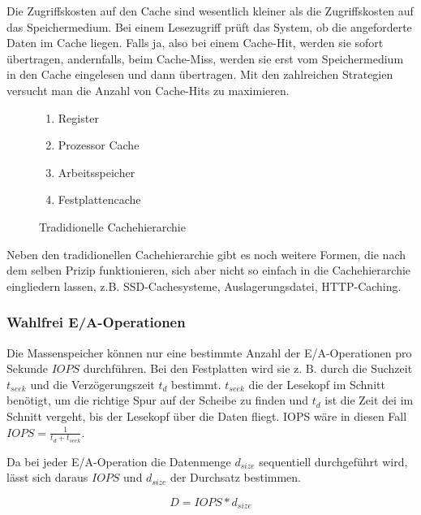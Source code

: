 Die Zugriffskosten auf den Cache sind wesentlich kleiner als die Zugriffskosten auf das Speichermedium. 
Bei einem Lesezugriff prüft das System, ob die angeforderte Daten im Cache liegen. 
Falls ja, also bei einem Cache-Hit, werden sie sofort übertragen, andernfalls, beim Cache-Miss, werden sie erst vom Speichermedium in den Cache eingelesen und dann übertragen. 
Mit den zahlreichen Strategien versucht man die Anzahl von Cache-Hits zu maximieren.  

\begin{figure}[h]
	\centering
	\begin{minipage}[t]{0.3\textwidth}
		\begin{enumerate}
			\item Register
			\item Prozessor Cache
			\item Arbeitsspeicher
			\item Festplattencache
		\end{enumerate}
	\end{minipage}
	\caption{Tradidionelle Cachehierarchie}
\end{figure}

Neben den tradidionellen Cachehierarchie gibt es noch weitere Formen, die nach dem selben Prizip funktionieren, sich aber nicht so einfach in die Cachehierarchie eingliedern lassen, z.B. SSD-Cachesysteme, Auslagerungsdatei, HTTP-Caching.

\subsubsection{Wahlfrei E/A-Operationen}
Die Massenspeicher können nur eine bestimmte Anzahl der E/A-Operationen pro Sekunde $IOPS$ durchführen. 
Bei den Festplatten wird sie z. B. durch die Suchzeit $t_{seek}$ und die Verzögerungszeit $t_{d}$ bestimmt. $t_{seek}$ die der Lesekopf im Schnitt benötigt, um die richtige Spur auf der Scheibe zu finden und $t_d$ ist die Zeit dei im Schnitt vergeht, bis der Lesekopf über die Daten fliegt. IOPS wäre in diesen Fall $IOPS = \frac{1}{t_d + t_{seek}}$.

Da bei jeder E/A-Operation die Datenmenge $d_{size}$ sequentiell durchgeführt wird, lässt sich daraus $IOPS$ und $d_{size}$ der Durchsatz bestimmen.

\begin{equation}
	D = IOPS * d_{size}
\end{equation}

